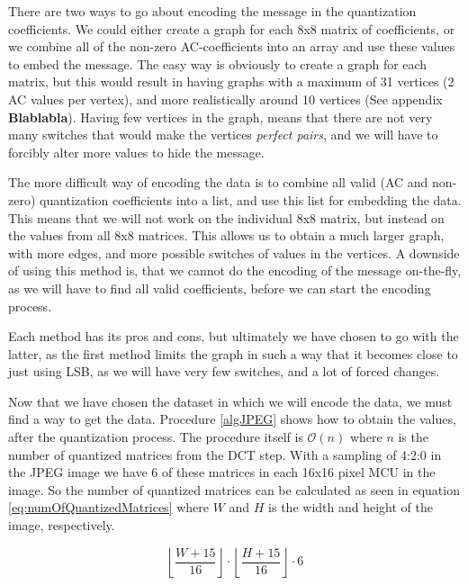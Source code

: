 There are two ways to go about encoding the message in the quantization coefficients. 
We could either create a graph for each 8x8 matrix of coefficients, or we combine all of the non-zero AC-coefficients into an array and use these values to embed the message. 
The easy way is obviously to create a graph for each matrix, but this would result in having graphs with a maximum of 31 vertices (2 AC values per vertex), and more realistically around 10 vertices (See appendix \textbf{Blablabla}). 
Having few vertices in the graph, means that there are not very many switches that would make the vertices \textit{perfect pairs}, and we will have to forcibly alter more values to hide the message.

The more difficult way of encoding the data is to combine all valid (AC and non-zero) quantization coefficients into a list, and use this list for embedding the data. 
This means that we will not work on the individual 8x8 matrix, but instead on the values from all 8x8 matrices. 
This allows us to obtain a much larger graph, with more edges, and more possible switches of values in the vertices. 
A downside of using this method is, that we cannot do the encoding of the message on-the-fly, as we will have to find all valid coefficients, before we can start the encoding process.

Each method has its pros and cons, but ultimately we have chosen to go with the latter, as the first method limits the graph in such a way that it becomes close to just using LSB, as we will have very few switches, and a lot of forced changes.

Now that we have chosen the dataset in which we will encode the data, we must find a way to get the data. 
Procedure \ref{algJPEG} shows how to obtain the values, after the quantization process. 
The procedure itself is $\mathcal{O}(n)$ where $n$ is the number of quantized matrices from the DCT step. 
With a sampling of 4:2:0 in the JPEG image we have 6 of these matrices in each 16x16 pixel MCU in the image. 
So the number of quantized matrices can be calculated as seen in equation \ref{eq:numOfQuantizedMatrices} where $W$ and $H$ is the width and height of the image, respectively.

\begin{equation}
\label{eq:numOfQuantizedMatrices}
\left \lfloor \frac{W + 15}{16}\right \rfloor \cdot \left \lfloor \frac{H + 15}{16}\right \rfloor \cdot 6
\end{equation}

